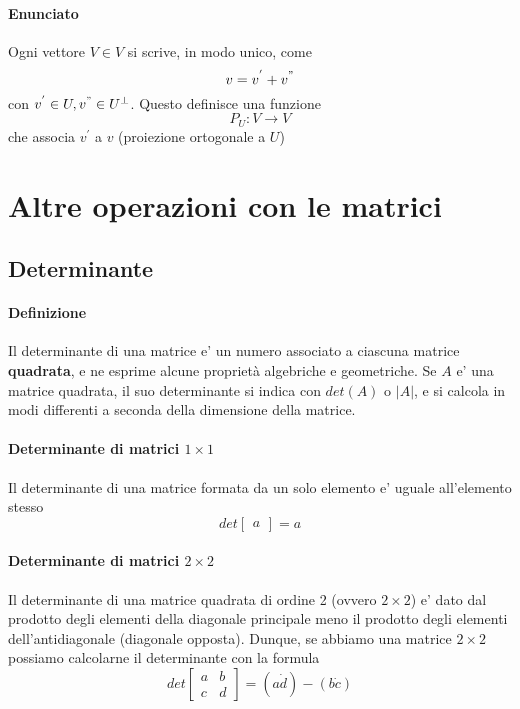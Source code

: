 \documentclass[a4paper, 10pt]{article}
\begin{document}
	\paragraph{Enunciato}
	Ogni vettore $V \in V$ si scrive, in modo unico, come \[v = v^{'} + v^{"} \] con $v^{'} \in U, v^{"} \in U^\perp$.
	Questo definisce una funzione \[P_U : V \rightarrow V \] che associa $v^{'}$ a $v$ (proiezione ortogonale a $U$) 
	
	\newpage
	\section{Altre operazioni con le matrici}
	
	\subsection{Determinante}
	\paragraph*{Definizione} 
	Il determinante di una matrice e' un numero associato a ciascuna matrice \textbf{quadrata}, 
	e ne esprime alcune proprietà algebriche e geometriche. Se $A$ e' una matrice quadrata, il suo determinante si 
	indica con $det(A)$ o $|A|$, e si calcola in modi differenti a seconda della dimensione della matrice.
	\paragraph*{Determinante di matrici $1 \times 1$}
	Il determinante di una matrice formata da un solo elemento e' uguale all'elemento stesso 
	\[ det \begin{bmatrix} a \end{bmatrix} = a \]
	\paragraph*{Determinante di matrici $2 \times 2$}
	Il determinante di una matrice quadrata di ordine 2 (ovvero $2 \times 2$) e' dato dal prodotto degli elementi della
	diagonale principale meno il prodotto degli elementi dell'antidiagonale (diagonale opposta). Dunque, se abbiamo una
	matrice $2 \times 2$ possiamo calcolarne il determinante con la formula 
	\[ det \begin{bmatrix} a & b \\ c & d \end{bmatrix} = (a \dot d) - (b \dot c) \]
\end{document}
